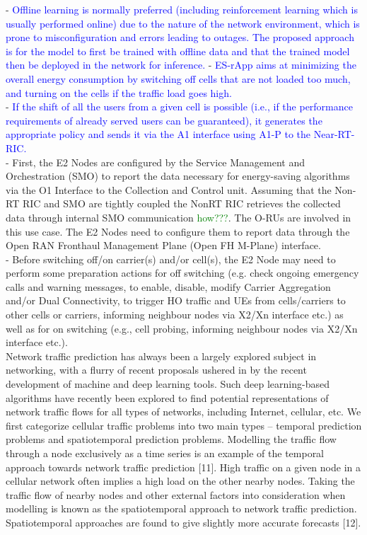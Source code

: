 \documentclass[conference]{IEEEtran}
\begin{document}
- \textcolor{blue}{Offline learning is normally preferred (including reinforcement learning which is usually performed online) due to the nature of the network environment, which is prone to misconfiguration and errors leading to outages. The proposed approach is for the model to first be trained with offline data and that the trained model then be deployed in the network for inference.} 
- \textcolor{blue}{ES-rApp aims at minimizing the overall energy consumption by switching off cells that are not loaded too much, and turning on the cells if the traffic load goes high.}\\
- \textcolor{blue}{If the shift of all the users from a given cell is possible (i.e., if the performance requirements of already served users can be guaranteed), it generates the appropriate policy and sends it via the A1 interface using A1-P to the Near-RT-RIC.} \\
- First, the E2 Nodes are configured by the Service Management and Orchestration (SMO) to report the data necessary for energy-saving algorithms via the O1 Interface to the Collection and Control unit. Assuming that the Non-RT RIC and SMO are tightly coupled the NonRT RIC retrieves the collected data through internal SMO communication \textcolor{green}{how???}. The O-RUs are involved in this use case. The E2 Nodes need to configure them to report data through the Open RAN Fronthaul Management Plane (Open FH M-Plane) interface.\\
- Before switching off/on carrier(s) and/or cell(s), the E2 Node may need to perform some preparation actions for off switching (e.g. check ongoing emergency calls and warning messages, to enable, disable, modify Carrier Aggregation and/or Dual Connectivity, to trigger HO traffic and UEs from cells/carriers to other cells or carriers, informing neighbour nodes via X2/Xn interface etc.) as well as for on switching (e.g., cell probing, informing neighbour nodes via X2/Xn interface etc.). \\

Network traffic prediction has always been a largely explored subject in networking, with a flurry of recent proposals ushered in by the recent development of machine and deep learning tools. Such deep learning-based algorithms have recently been explored to find potential representations of network traffic flows for all types of networks, including Internet, cellular, etc. We first categorize cellular traffic problems into two main types – temporal prediction problems and spatiotemporal prediction problems. Modelling the traffic flow through a node exclusively as a time series is an example of the temporal approach towards network traffic prediction [11]. High traffic on a given node in a cellular network often implies a high load on the other nearby nodes. Taking the traffic flow of nearby nodes and other external factors into consideration when modelling is known as the spatiotemporal approach to network traffic prediction. Spatiotemporal approaches are found to give slightly more accurate forecasts [12].
\end{document}
